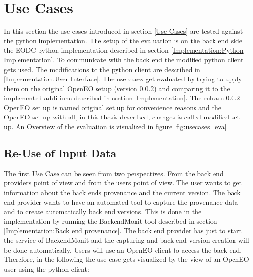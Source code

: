 \documentclass[draft,final]{vutinfth} %
\begin{document}

 

\section{Use Cases}\label{Evaluation:Use Cases}
In this section the use cases introduced in section \ref{Use Cases} are tested against the python implementation. The setup of the evaluation is on the back end side the EODC python implementation described in section \ref{Implementation:Python Implementation}. To communicate with the back end the modified python client gets used. The modifications to the python client are described in \ref{Implementation:User Interface}. The use cases get evaluated by trying to apply them on the original OpenEO setup (version 0.0.2) and comparing it to the implemented additions described in section \ref{Implementation}. The release-0.0.2 OpenEO set up is named original set up for convenience reasons and the OpenEO set up with all, in this thesis described, changes is called modified set up. An Overview of the evaluation is visualized in figure \ref{fig:usecases_eva} 

\subsection{Re-Use of Input Data}\label{Evaluation:Use Case1}
The first Use Case can be seen from two perspectives. From the back end providers point of view and from the users point of view. The user wants to get information about the back ends provenance and the current version. The back end provider wants to have an automated tool to capture the provenance data and to create automatically back end versions. This is done in the implementation by running the BackendMonit tool described in section \ref{Implementation:Back end provenance}. The back end provider has just to start the service of BackendMonit and the capturing and back end version creation will be done automatically. 
Users will use an OpenEO client to access the back end. Therefore, in the following the use case gets visualized by the view of an OpenEO user using the python client: 
\end{document}
